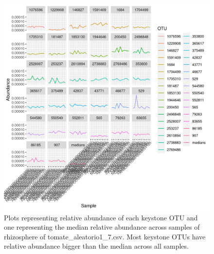 \begin{figure}
   \centering
   \includegraphics[scale = 0.8]{abundance_tomate_aleatorio1_7.csv_key_otus_medians.png}
   \caption{Plots representing relative abundance of each keystone OTU and one representing the median relative abundance  across samples of rhizosphere of tomate_aleatorio1_7.csv. Most keystone OTUs have relative abundance bigger than the median across all samples.  }
   \label{key_otus_vs_medians_tomate_aleatorio1_7.csv}
\end{figure}
